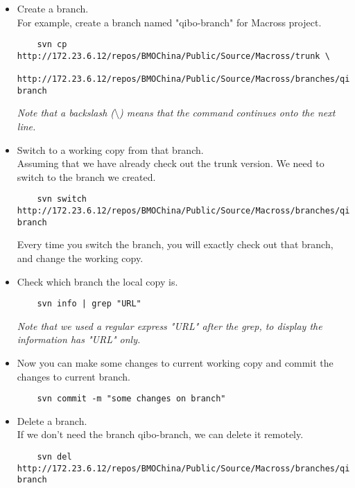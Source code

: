 \documentclass{article}
\begin{document}
\begin{itemize}
\item
	Create a branch.\\
	For example, create a branch named "qibo-branch" for Macross project.
	\begin{lstlisting}
	svn cp http://172.23.6.12/repos/BMOChina/Public/Source/Macross/trunk \
	http://172.23.6.12/repos/BMOChina/Public/Source/Macross/branches/qibo-branch
	\end{lstlisting}	
\textit{Note that a backslash ($\setminus$) means that the command continues onto the next line.}	
\item
	Switch to a working copy from that branch. \\ 
	Assuming that we have already check out the trunk version. We need to switch to the branch we created.
	\begin{lstlisting}
	svn switch http://172.23.6.12/repos/BMOChina/Public/Source/Macross/branches/qibo-branch
	\end{lstlisting}	
	Every time you switch the branch, you will exactly check out that branch, and change the working copy.
\item
	Check which branch the local copy is.
	\begin{lstlisting}
	svn info | grep "URL"
	\end{lstlisting}	
\textit{Note that we used a regular express "URL" after the grep, to display the information has "URL" only.}
\item
	Now you can make some changes to current working copy and commit the changes to current branch.
	\begin{lstlisting}
	svn commit -m "some changes on branch"
	\end{lstlisting}	
\item
	Delete a branch. \\ 
	If we don't need the branch qibo-branch, we can delete it remotely.
	\begin{lstlisting}
	svn del http://172.23.6.12/repos/BMOChina/Public/Source/Macross/branches/qibo-branch
	\end{lstlisting}
\end{itemize}
\end{document}
